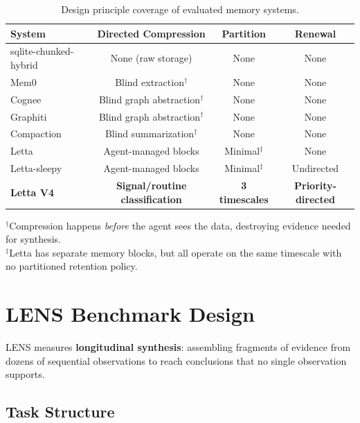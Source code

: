 \documentclass[11pt,letterpaper]{article}
\begin{document}
\begin{table}[H]
\centering
\small
\caption{Design principle coverage of evaluated memory systems.}
\label{tab:coverage}
\begin{tabular}{lccc}
\toprule
\textbf{System} & \textbf{Directed Compression} & \textbf{Partition} & \textbf{Renewal} \\
\midrule
sqlite-chunked-hybrid & None (raw storage) & None & None \\
Mem0 & Blind extraction$^\dagger$ & None & None \\
Cognee & Blind graph abstraction$^\dagger$ & None & None \\
Graphiti & Blind graph abstraction$^\dagger$ & None & None \\
Compaction & Blind summarization$^\dagger$ & None & None \\
Letta & Agent-managed blocks & Minimal$^\ddagger$ & None \\
Letta-sleepy & Agent-managed blocks & Minimal$^\ddagger$ & Undirected \\
\rowcolor{lightgreen}
\textbf{Letta V4} & \textbf{Signal/routine classification} & \textbf{3 timescales} & \textbf{Priority-directed} \\
\bottomrule
\end{tabular}

\vspace{0.5em}
\footnotesize
$^\dagger$Compression happens \emph{before} the agent sees the data, destroying evidence needed for synthesis.\\
$^\ddagger$Letta has separate memory blocks, but all operate on the same timescale with no partitioned retention policy.
\end{table}

\section{LENS Benchmark Design}
\label{sec:lens}

LENS measures \textbf{longitudinal synthesis}: assembling fragments of evidence from dozens of sequential observations to reach conclusions that no single observation supports.

\subsection{Task Structure}
\end{document}
